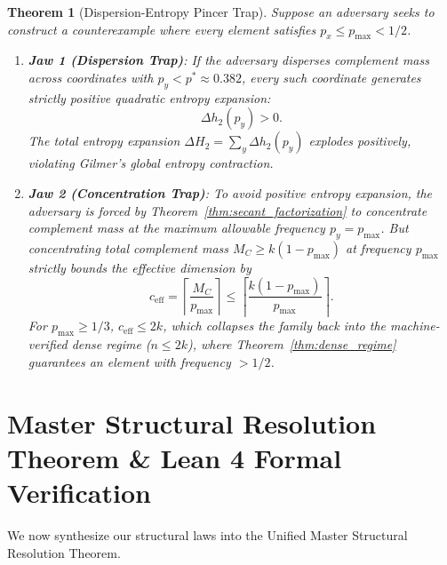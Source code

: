 \documentclass[11pt,a4paper]{article}
\theoremstyle{plain}
\newtheorem{theorem}{Theorem}[section]
\theoremstyle{definition}
\theoremstyle{remark}
\begin{document}
\begin{theorem}[Dispersion-Entropy Pincer Trap]\label{thm:pincer_trap}
Suppose an adversary seeks to construct a counterexample where every element satisfies $p_x \le p_{\max} < 1/2$.
\begin{enumerate}
    \item \textbf{Jaw 1 (Dispersion Trap)}: If the adversary disperses complement mass across coordinates with $p_y < p^* \approx 0.382$, every such coordinate generates strictly positive quadratic entropy expansion:
    \begin{equation}
    \Delta h_2(p_y) > 0.
    \end{equation}
    The total entropy expansion $\Delta H_2 = \sum_y \Delta h_2(p_y)$ explodes positively, violating Gilmer's global entropy contraction.
    \item \textbf{Jaw 2 (Concentration Trap)}: To avoid positive entropy expansion, the adversary is forced by Theorem~\ref{thm:secant_factorization} to concentrate complement mass at the maximum allowable frequency $p_y = p_{\max}$. But concentrating total complement mass $M_C \ge k(1 - p_{\max})$ at frequency $p_{\max}$ strictly bounds the effective dimension by
    \begin{equation}
    c_{\text{eff}} = \left\lceil \frac{M_C}{p_{\max}} \right\rceil \le \left\lceil \frac{k(1 - p_{\max})}{p_{\max}} \right\rceil.
    \end{equation}
    For $p_{\max} \ge 1/3$, $c_{\text{eff}} \le 2k$, which collapses the family back into the machine-verified dense regime ($n \le 2k$), where Theorem~\ref{thm:dense_regime} guarantees an element with frequency $> 1/2$.
\end{enumerate}
\end{theorem}

\section{Master Structural Resolution Theorem \& Lean 4 Formal Verification}\label{sec:master}

We now synthesize our structural laws into the Unified Master Structural Resolution Theorem.
\end{document}
